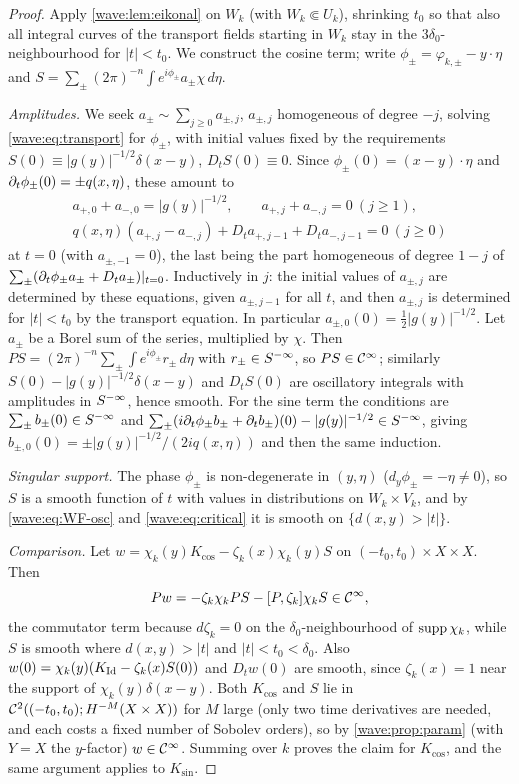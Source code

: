 \begin{proof}
Apply \cref{wave:lem:eikonal} on $W_k$ (with $W_k\Subset U_k$), shrinking $t_0$
so that also all integral curves of the transport fields starting in $W_k$ stay in
the $3\delta_0$-neighbourhood for $|t|<t_0$. We construct the cosine term; write
$\phi_\pm=\varphi_{k,\pm}-y\cdot\eta$ and $S=\sum_\pm(2\pi)^{-n}\int e^{i\phi_\pm}a_\pm\chi\,d\eta$.

\emph{Amplitudes.} We seek $a_\pm\sim\sum_{j\ge0}a_{\pm,j}$, $a_{\pm,j}$ homogeneous
of degree $-j$, solving \eqref{wave:eq:transport} for $\phi_\pm$, with initial values
fixed by the requirements $S(0)\equiv|g(y)|^{-1/2}\delta(x-y)$, $D_tS(0)\equiv0$.
Since $\phi_\pm(0)=(x-y)\cdot\eta$ and $\partial_t\phi_\pm(0)=\pm q(x,\eta)$, these amount to
\begin{gather*}
a_{+,0}+a_{-,0}=|g(y)|^{-1/2},\qquad a_{+,j}+a_{-,j}=0\ (j\ge1),\\
q(x,\eta)(a_{+,j}-a_{-,j})+D_ta_{+,j-1}+D_ta_{-,j-1}=0\ (j\ge0)
\end{gather*}
at $t=0$ (with $a_{\pm,-1}=0$), the last being the part homogeneous of degree
$1-j$ of $\sum_\pm(\partial_t\phi_\pm a_\pm+D_ta_\pm)|_{t=0}$. Inductively in $j$: the
initial values of $a_{\pm,j}$ are determined by these equations, given
$a_{\pm,j-1}$ for all $t$, and then $a_{\pm,j}$ is determined for $|t|<t_0$ by the
transport equation. In particular $a_{\pm,0}(0)=\frac12|g(y)|^{-1/2}$. Let $a_\pm$ be
a Borel sum of the series, multiplied by $\chi$. Then
$PS=(2\pi)^{-n}\sum_\pm\int e^{i\phi_\pm}r_\pm\,d\eta$ with $r_\pm\in S^{-\infty}$, so
$PS\in\mathcal{C}^\infty$; similarly $S(0)-|g(y)|^{-1/2}\delta(x-y)$ and $D_tS(0)$ are oscillatory
integrals with amplitudes in $S^{-\infty}$, hence smooth. For the sine term the
conditions are $\sum_\pm b_\pm(0)\in S^{-\infty}$ and
$\sum_\pm(i\partial_t\phi_\pm b_\pm+\partial_tb_\pm)(0)-|g(y)|^{-1/2}\in S^{-\infty}$, giving
$b_{\pm,0}(0)=\pm|g(y)|^{-1/2}/(2iq(x,\eta))$ and then the same induction.

\emph{Singular support.} The phase $\phi_\pm$ is non-degenerate in $(y,\eta)$
($d_y\phi_\pm=-\eta\ne0$), so $S$ is a smooth function of $t$ with values in
distributions on $W_k\times V_k$, and by \eqref{wave:eq:WF-osc} and
\eqref{wave:eq:critical} it is smooth on $\{d(x,y)>|t|\}$.

\emph{Comparison.} Let $w=\chi_k(y)K_{\cos}-\zeta_k(x)\chi_k(y)S$ on
$(-t_0,t_0)\times X\times X$. Then
\begin{equation*}
Pw=-\zeta_k\chi_kPS-[P,\zeta_k]\chi_kS\in\mathcal{C}^\infty,
\end{equation*}
the commutator term because $d\zeta_k=0$ on the $\delta_0$-neighbourhood of
$\operatorname{supp}\chi_k$, while $S$ is smooth where $d(x,y)>|t|$ and $|t|<t_0<\delta_0$. Also
$w(0)=\chi_k(y)(K_{\operatorname{Id}}-\zeta_k(x)S(0))$ and $D_tw(0)$ are smooth, since
$\zeta_k(x)=1$ near the support of $\chi_k(y)\delta(x-y)$. Both $K_{\cos}$ and $S$ lie
in $\mathcal C^2((-t_0,t_0);H^{-M}(X\times X))$ for $M$ large (only two time
derivatives are needed, and each costs a fixed number of Sobolev orders), so by
\cref{wave:prop:param}
(with $Y=X$ the $y$-factor) $w\in\mathcal{C}^\infty$. Summing over $k$ proves the claim for
$K_{\cos}$, and the same argument applies to $K_{\sin}$.
\end{proof}

